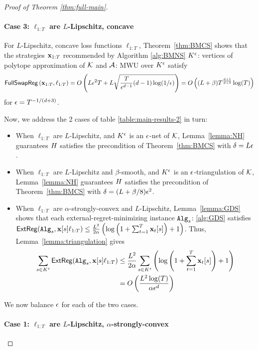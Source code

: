 \begin{proof}[Proof of Theorem \ref{thm:full-main}]
    \paragraph{Case 3: $\ell_{1:T}$ are $L$-Lipschitz, concave}

    For $L$-Lipschitz, concave loss functions $\ell_{1:T}$, Theorem~\ref{thm:BMCS} shows that the strategies $\mathbf{x}_{1:T}$ recommended by Algorithm \ref{alg:BMNS} $K^{\epsilon}$: vertices of polytope approximation of $\mathcal{K}$ and $\mathcal{A}$: MWU over $K^{\epsilon}$ satisfy
    \begin{equation*}
        \mathsf{FullSwapReg}\left(\mathbf{x}_{1:T},\ell_{1:T}\right) = O\left(L \epsilon^2 T + L\sqrt{\frac{T}{\epsilon^{d-1}}(d-1)\log(1/\epsilon)}\right) = O\left((L+\beta)T^{\frac{d+1}{d+3}}\log(T)\right)
    \end{equation*}
    for $\epsilon = T^{-1/(d+3)}$.

    Now, we address the 2 cases of table \ref{table:main-results-2} in turn:

    \begin{itemize}
        \item When $\ell_{1:T}$ are $L$-Lipschitz, and $K^{\epsilon}$ is an $\epsilon$-net of $\mathcal{K}$, Lemma~\ref{lemma:NH} guarantees $H$ satisfies the precondition of Theorem~\ref{thm:BMCS} with $\delta = L\epsilon$.
        \item When $\ell_{1:T}$ are $L$-Lipschitz and $\beta$-smooth, and $K^{\epsilon}$ is an $\epsilon$-triangulation of $\mathcal{K}$, Lemma~\ref{lemma:NH} guarantees $H$ satisfies the precondition of Theorem~\ref{thm:BMCS} with $\delta = (L+\beta/8)\epsilon^2$.
        \item When $\ell_{1:T}$ are $\alpha$-strongly-convex and $L$-Lipschitz, Lemma~\ref{lemma:GDS} shows that each external-regret-minimizing instance $\mathtt{Alg}_s$: \ref{alg:GDS} satisfies $\mathsf{ExtReg}(\mathtt{Alg}_s, \mathbf{x}[s]\ell_{1:T}) \leq \frac{L^2}{2\alpha}\left(\log\left(1+\sum_{t=1}^T \mathbf{x}_t[s]\right)+1\right)$.  Thus, Lemma~\ref{lemma:triangulation} gives \begin{align*}
            \sum_{s \in K^{\epsilon}} \mathsf{ExtReg}(\mathtt{Alg}_s, \mathbf{x}[s]\ell_{1:T}) & \leq \frac{L^2}{2\alpha}\sum_{s \in K^{\epsilon}} \left(\log\left(1+\sum_{t=1}^T \mathbf{x}_t[s]\right)+1\right)\\
            &= O\left(\frac{L^2 \log(T)}{\alpha \epsilon^d}\right)\\
        \end{align*}
    \end{itemize}
    

    We now balance $\epsilon$ for each of the two cases.
    
    \paragraph{Case 1: $\ell_{1:T}$ are $L$-Lipschitz, $\alpha$-strongly-convex}


\end{proof}
